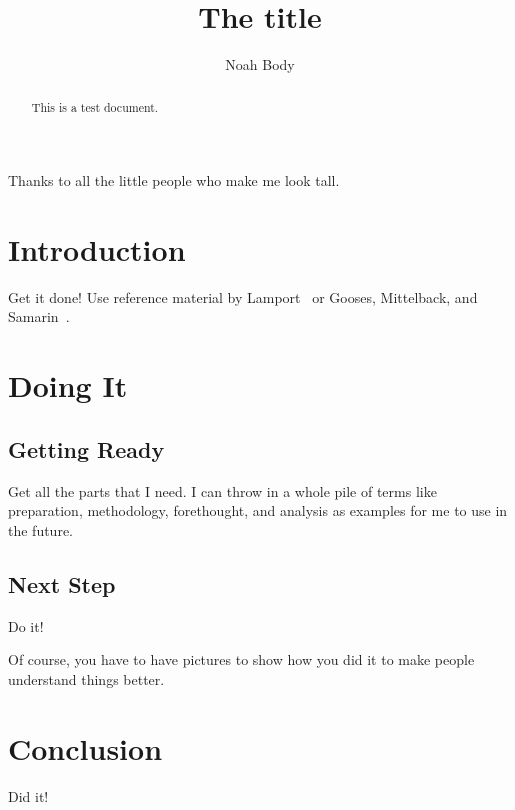 \documentclass[12pt,glossary]{dalthesis}
\begin{document}
\mcs  %
\title{The title}
\author{Noah Body}



\nolistoftables
\nolistoffigures

\frontmatter

\begin{abstract}
This is a test document.
\end{abstract}

\printglossary

\begin{acknowledgements}
Thanks to all the little people who make me look tall.
\end{acknowledgements}

\mainmatter

\chapter{Introduction}

Get it done!  Use reference material by Lamport~\cite{latex-by-lamport} or
Gooses, Mittelback, and Samarin~\cite{latex-companion}.

\chapter{Doing It}

\section{Getting Ready}

Get all the parts that I need.  I can throw in a whole pile of terms like
preparation,
methodology,
forethought,
and
analysis
as examples for me to use in the future.

\section{Next Step}

Do it!

Of course, you have to have pictures to show how you did it to make people
understand things better.

\chapter{Conclusion}

Did it!



\end{document}
